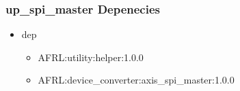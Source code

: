 \subsubsection{up\_spi\_master Depenecies}
\begin{itemize}
\item dep
	\begin{itemize}
	\item AFRL:utility:helper:1.0.0
	\item AFRL:device\_converter:axis\_spi\_master:1.0.0
	\end{itemize}
\end{itemize}
